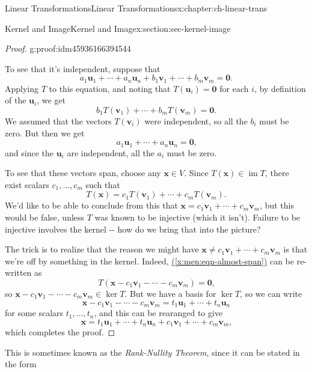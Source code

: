 \documentclass[oneside,10pt,]{book}
\newcommand{\xreffont}{\relax}
\numberwithin{equation}{section}
\newcommand{\im}{\operatorname{im}}
\newcommand{\uu}{\mathbf{u}}
\newcommand{\vv}{\mathbf{v}}
\newcommand{\xx}{\mathbf{x}}
\begin{document}
\begin{chapterptx}{Linear Transformations}{}{Linear Transformations}{}{}{x:chapter:ch-linear-trans}
\begin{sectionptx}{Kernel and Image}{}{Kernel and Image}{}{}{x:section:sec-kernel-image}
\begin{proof}{}{g:proof:idm45936166394544}
\par
To see that it's independent, suppose that%
\begin{equation*}
a_1\uu_1+\cdots + a_n\uu_n+b_1\vv_1+\cdots +b_m\vv_m=\mathbf{0}\text{.}
\end{equation*}
Applying \(T\) to this equation, and noting that \(T(\uu_i)=\mathbf{0}\) for each \(i\), by definition of the \(\uu_i\), we get%
\begin{equation*}
b_1T(\vv_1)+\cdots +b_mT(\vv_m)=\mathbf{0}\text{.}
\end{equation*}
We assumed that the vectors \(T(\vv_i)\) were independent, so all the \(b_i\) must be zero. But then we get%
\begin{equation*}
a_1\uu_1+\cdots +a_n\uu_n=\mathbf{0}\text{,}
\end{equation*}
and since the \(\uu_i\) are independent, all the \(a_i\) must be zero.%
\par
To see that these vectors span, choose any \(\xx\in V\). Since \(T(\xx)\in \im T\), there exist scalars \(c_1,\ldots, c_m\) such that%
\begin{equation}
T(\xx)=c_1T(\vv_1)+\cdots +c_mT(\vv_m)\text{.}\label{x:men:eqn-almost-span}
\end{equation}
We'd like to be able to conclude from this that \(\xx=c_1\vv_1+\cdots +c_m\vv_m\), but this would be false, unless \(T\) was known to be injective (which it isn't). Failure to be injective involves the kernel -{}-{} how do we bring that into the picture?%
\par
The trick is to realize that the reason we might have \(\xx\neq c_1\vv_1+\cdots +c_m\vv_m\) is that we're off by something in the kernel. Indeed, \hyperref[x:men:eqn-almost-span]{({\xreffont\ref{x:men:eqn-almost-span}})} can be re-written as%
\begin{equation*}
T(\xx-c_1\vv_1-\cdots -c_m\vv_m) = \mathbf{0}\text{,}
\end{equation*}
so \(\xx-c_1\vv_1-\cdots -c_m\vv_m\in\ker T\). But we have a basis for \(\ker T\), so we can write%
\begin{equation*}
\xx-c_1\vv_1-\cdots -c_m\vv_m=t_1\uu_1+\cdots +t_n\uu_n
\end{equation*}
for some scalars \(t_1,\ldots, t_n\), and this can be rearanged to give%
\begin{equation*}
\xx=t_1\uu_1+\cdots +t_n\uu_n+c_1\vv_1+\cdots + c_m\vv_m\text{,}
\end{equation*}
which completes the proof.%
\end{proof}
This is sometimes known as the \emph{Rank-Nullity Theorem}, since it can be stated in the form%

\end{sectionptx}
\end{chapterptx}
\end{document}
